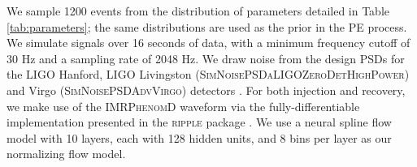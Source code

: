 \documentclass[twocolumn]{aastex631}
\begin{document}
We sample 1200 events from the distribution of parameters detailed in Table
\ref{tab:parameters}; the same distributions are used as the prior in the PE
process.  We simulate signals over 16 seconds of data, with a minimum frequency
cutoff of 30 Hz and a sampling rate of 2048 Hz.  We draw noise from the design
PSDs for the LIGO Hanford, LIGO Livingston
(\textsc{SimNoisePSDaLIGOZeroDetHighPower}) and Virgo
(\textsc{SimNoisePSDAdvVirgo}) detectors \cite{}. For both injection and
recovery, we make use of the \textsc{IMRPhenomD} waveform \cite{Khan:2015jqa}
via the fully-differentiable implementation presented in the \textsc{ripple}
package \cite{}. We use a neural spline flow model \cite{2019arXiv190604032D}
with 10 layers, each with 128 hidden units, and 8 bins per layer as our
normalizing flow model.
\end{document}
